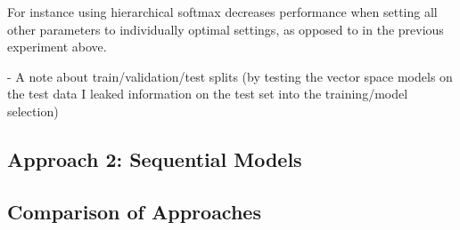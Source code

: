 For instance using hierarchical softmax decreases performance when setting all other parameters to individually optimal settings, as opposed to in the previous experiment above.


%

%

%

- A note about train/validation/test splits (by testing the vector space models on the test data I leaked information on the test set into the training/model selection)


\subsection{Approach 2: Sequential Models}
\label{sub:Approach 2: Sequential Models (Results)}



\subsection{Comparison of Approaches}
